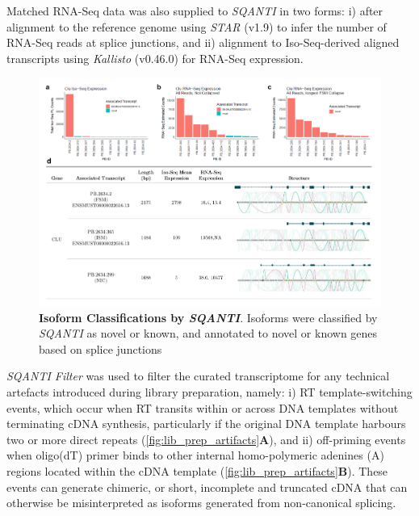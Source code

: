 Matched RNA-Seq data was also supplied to \textit{SQANTI} in two forms: i) after alignment to the reference genome using \textit{STAR}\cite{Dobin2013} (v1.9) to infer the number of RNA-Seq reads at splice junctions, and ii) alignment to Iso-Seq-derived aligned transcripts using \textit{Kallisto}\cite{Bray2016} (v0.46.0) for RNA-Seq expression.  

\begin{landscape}
	\begin{figure}[h]
		\centering
		\includegraphics[page=3,trim={0 4cm 0 0},clip,scale = 0.9]{Figures/ProjectDevelopment_Figures_Landscape}
		\captionsetup{width=1.5\textwidth}
		\caption[Isoform Classifications by \textit{SQANTI}]%
		{\textbf{Isoform Classifications by \textit{SQANTI}}. Isoforms were classified by \textit{SQANTI} as novel or known, and annotated to novel or known genes based on splice junctions}
		\label{fig:sqanti_cate}
	\end{figure}
\end{landscape}

\textit{SQANTI Filter} was used to filter the curated transcriptome for any technical artefacts introduced during library preparation, namely: i) RT template-switching events, which occur when RT transits within or across DNA templates without terminating cDNA synthesis, particularly if the original DNA template harbours two or more direct repeats\cite{Cocquet2006} (\cref{fig:lib_prep_artifacts}\textbf{A}), and ii) off-priming events when oligo(dT) primer binds to other internal homo-polymeric adenines (A) regions located within the cDNA template\cite{Conesa2016} (\cref{fig:lib_prep_artifacts}\textbf{B}). These events can generate chimeric, or short, incomplete and truncated cDNA that can otherwise be misinterpreted as isoforms generated from non-canonical splicing\cite{Houseley2010}. 

